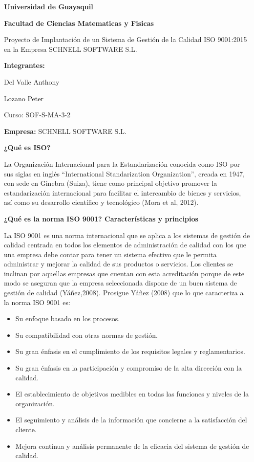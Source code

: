 \documentclass[10pt,a4paper]{article}
\begin{document}
\begin{center}
\textbf{Universidad de Guayaquil}

\textbf{Facultad de Ciencias Matematicas y Fisicas}

Proyecto de Implantación de un Sistema de Gestión de la Calidad ISO 9001:2015 en la Empresa SCHNELL SOFTWARE S.L.

\textbf{Integrantes:}

Del Valle Anthony

Lozano Peter

Curso: SOF-S-MA-3-2
\end{center}

\textbf{Empresa: }SCHNELL SOFTWARE S.L.

\textbf{¿Qué es ISO?}

La Organización Internacional para la Estandarización conocida como ISO por sus siglas en inglés “International Standarization Organization”, creada en 1947, con sede en Ginebra (Suiza), tiene como principal objetivo promover la estandarización internacional para facilitar el intercambio de bienes y servicios, así como su desarrollo científico y tecnológico (Mora et al, 2012).

\textbf{¿Qué es la norma ISO 9001? Características y principios}

La ISO 9001 es una norma internacional que se aplica a los sistemas de gestión de calidad centrada en todos los elementos de administración de calidad con los que una empresa debe contar para tener un sistema efectivo que le permita administrar y mejorar la calidad de sus productos o servicios. Los clientes se inclinan por aquellas empresas que cuentan con esta acreditación porque de este modo se aseguran que la empresa seleccionada dispone de un buen sistema de gestión de calidad (Yáñez,2008).
Prosigue Yáñez (2008) que lo que caracteriza a la norma ISO 9001 es:
\begin{itemize}
\item Su enfoque basado en los procesos.
\item Su compatibilidad con otras normas de gestión.
\item Su gran énfasis en el cumplimiento de los requisitos legales y reglamentarios.
\item Su gran énfasis en la participación y compromiso de la alta dirección con la calidad.
\item El establecimiento de objetivos medibles en todas las funciones y niveles de la organización.
\item El seguimiento y análisis de la información que concierne a la satisfacción del cliente.
\item Mejora continua y análisis permanente de la eficacia del sistema de gestión de calidad.
\end{itemize}
\end{document}
